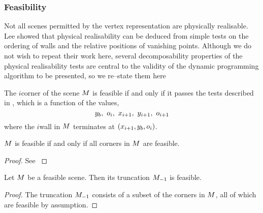 \subsubsection{Feasibility}

Not all scenes permitted by the vertex representation are physically
realisable. Lee \etal \cite{Lee09} showed that physical realisability
can be deduced from simple tests on the ordering of walls and the
relative positions of vanishing points. Although we do not wish to
repeat their work here, several decomposability properties of the
physical realisability tests are central to the validity of the
dynamic programming algorithm to be presented, so we re--state them
here

\begin{definition}
  \label{def:feasible-corners}
  The $i$\th corner of the scene $\Scene$ is feasible if and only if
  it passes the tests described in \cite{Lee09}, which is a
  function of the values,
  \begin{equation}
    y_b,~\WallOrient_i,~x_{i+1},~y_{i+1},~\WallOrient_{i+1}
  \end{equation}
  where the $i$\th wall in $\Scene$ terminates at
  $(x_{i+1},y_b,\WallOrient_i)$.
\end{definition}

\begin{lemma}
  \label{def:feasible-scenes}
  $\Scene$ is feasible if and only if all corners in $\Scene$ are feasible.
\end{lemma}
\begin{proof}
  See \cite{Lee09}
\end{proof}

\begin{lemma}
  \label{lemma:trunc-feasibility}
  Let $\Scene$ be a feasible scene. Then its truncation $\Scene_{-1}$ is
  feasible.
\end{lemma}
\begin{proof}
  The truncation $\Scene_{-1}$ consists of a subset of the corners in
  $\Scene$, all of which are feasible by assumption.
\end{proof}

